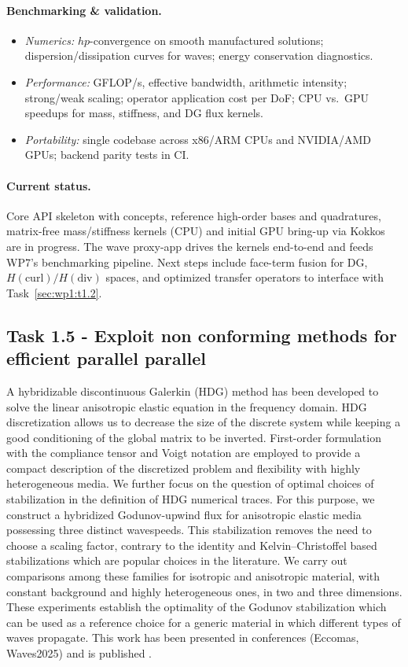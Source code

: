 \paragraph{Benchmarking \& validation.}
\begin{itemize}
  \item \textit{Numerics:} $h\!p$-convergence on smooth manufactured solutions; dispersion/dissipation curves for waves; energy conservation diagnostics.
  \item \textit{Performance:} GFLOP/s, effective bandwidth, arithmetic intensity; strong/weak scaling; operator application cost per DoF; CPU vs.\ GPU speedups for mass, stiffness, and DG flux kernels.
  \item \textit{Portability:} single codebase across x86/ARM CPUs and NVIDIA/AMD GPUs; backend parity tests in CI.
\end{itemize}

\paragraph{Current status.}
Core API skeleton with concepts, reference high-order bases and quadratures, matrix-free mass/stiffness kernels (CPU) and initial GPU bring-up via Kokkos are in progress. The wave proxy-app drives the kernels end-to-end and feeds WP7’s benchmarking pipeline. Next steps include face-term fusion for DG, $H(\mathrm{curl})/H(\mathrm{div})$ spaces, and optimized transfer operators to interface with Task~\ref{sec:wp1:t1.2}.


\subsection{Task 1.5 - Exploit non conforming methods for efficient parallel parallel}
A hybridizable discontinuous Galerkin (HDG) method has been developed to solve the linear anisotropic elastic equation in the frequency domain. HDG discretization allows us to decrease the size of the discrete system while keeping a good conditioning of the global matrix to be inverted. First-order formulation with the compliance tensor and Voigt notation are employed to provide a compact description of the discretized problem and flexibility with highly heterogeneous media. We further focus on the question of optimal choices of stabilization in the definition of HDG numerical traces. For this purpose, we construct a hybridized Godunov-upwind flux for anisotropic elastic media possessing three distinct wavespeeds. This stabilization removes the need to choose a scaling factor, contrary to the identity and Kelvin–Christoffel based stabilizations which are popular choices in the literature. We carry out comparisons among these families for isotropic and anisotropic material, with constant background and highly heterogeneous ones, in two and three dimensions. These experiments establish the optimality of the Godunov stabilization which can be used as a reference choice for a generic material in which different types of waves propagate. This work has been presented in conferences (Eccomas, Waves2025) and is published \cite{pham_numerical_2024}.


